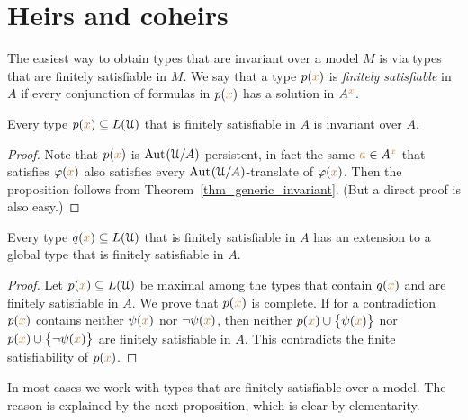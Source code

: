 \section{Heirs and coheirs}
\label{coheirs}


\def\medrel#1{\parbox[t]{6ex}{$\displaystyle\hfil #1$}}
\def\ceq#1#2#3{\parbox[t]{16ex}{$\displaystyle #1$}\medrel{#2}{$\displaystyle #3$}}

The easiest way to obtain types that are invariant over a model $M$ is via types that are finitely satisfiable in $M$.
We say that a type $p({\color{brown} x})$ is \emph{finitely satisfiable\/} in $A$ if every conjunction of formulas in $p({\color{brown} x})$ has a solution in $A^{\color{brown} x}$.

\begin{proposition}\label{prop_coeredi_quasiinvarienti}
Every type $p({\color{brown} x})\subseteq L(\EuScript U)$ that is finitely satisfiable in $A$ is invariant over $A$.
\end{proposition}

\begin{proof}
  Note that $p({\color{brown} x})$ is ${\rm Aut\kern.15ex}(\EuScript U/A)$-persistent, in fact the same ${\color{brown} a}\in A^{\color{brown} x}$ that satisfies $\varphi({\color{brown} x})$ also satisfies every ${\rm Aut\kern.15ex}(\EuScript U/A)$-translate of $\varphi({\color{brown} x})$.
  Then the proposition follows from Theorem~\ref{thm_generic_invariant}.
  (But a direct proof is also easy.)  
\end{proof}

\begin{proposition}\label{prop_exisntence_coheirs}
Every type $q({\color{brown} x})\subseteq L(\EuScript U)$ that is finitely satisfiable in $A$ has an extension to a global type that is finitely satisfiable in $A$.
\end{proposition}

\begin{proof} 
Let $p({\color{brown} x})\subseteq L(\EuScript U)$ be maximal among the types that contain $q({\color{brown} x})$ and are finitely satisfiable in $A$.
We prove that $p({\color{brown} x})$ is complete.
If for a contradiction $p({\color{brown} x})$ contains neither $\psi({\color{brown} x})$ nor $\neg\psi({\color{brown} x})$, then  neither $p({\color{brown} x})\cup\big\{\psi({\color{brown} x})\big\}$ nor $p({\color{brown} x})\cup\big\{\neg\psi({\color{brown} x})\big\}$ are finitely satisfiable in $A$.
This contradicts the finite satisfiability of $p({\color{brown} x})$.
\end{proof}

In most cases we work with types that are finitely satisfiable over a model.
The reason is explained by the next proposition, which is clear by elementarity.


